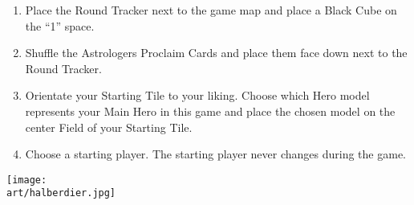 \begin{multicols*}{2}
\begin{enumerate}
  \item Place the Round Tracker next to the game map and place a Black Cube on the ``1'' space.
  \item Shuffle the Astrologers Proclaim Cards and place them face down next to the Round Tracker.
  \item Orientate your Starting Tile to your liking.
    Choose which Hero model represents your Main Hero in this game and place the chosen model on the center Field of your Starting Tile.
  \item Choose a starting player. The starting player never changes during the game.
\end{enumerate}

\texttt{[image: \\art/halberdier.jpg]}

\vspace*{\fill}

\end{multicols*}
